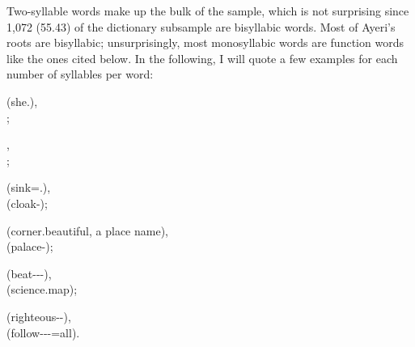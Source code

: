 Two-syllable words make up the bulk of the sample, which is not surprising since 
1,072 (55.43\pct) of the dictionary subsample are bisyllabic words. Most of 
Ayeri's roots are bisyllabic; unsurprisingly, most monosyllabic words are 
function words like the ones cited below. In the following, I will quote a few 
examples for each number of syllables per word:

\pex
	\a {} (she.\Aarg{}),\\
		;
		
	\a {},\\
		;
		
	\a {} (sink=\TsgM{}.\Aarg{}),\\
		 (cloak-\PargI{});
		
	\a {} (corner.beautiful, a place name),\\
		 (palace-\Gen{});
		
	\a {} (beat-\Ptcp{}-\Nmlz{}-\Parg{}),\\
		 (science.map);
		
	\a {} (righteous-\Nmlz{}-\Gen{}),\\
		 (follow-\Agtz-\Pl{}-\Aarg{}=all).
\xe

